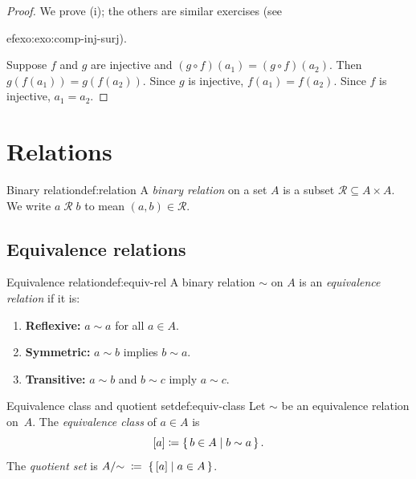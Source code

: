 \begin{proof}
We prove (i); the others are similar exercises (see

ef{exo:exo:comp-inj-surj}).

Suppose $f$ and $g$ are injective and $(g\circ f)(a_1) = (g\circ f)(a_2)$.
Then $g(f(a_1)) = g(f(a_2))$. Since $g$ is injective,
$f(a_1) = f(a_2)$. Since $f$ is injective, $a_1 = a_2$.
\end{proof}


\section{Relations}\label{sec:relations}

\begin{definition}{Binary relation}{def:relation}
A \emph{binary relation} on a set $A$ is a subset
$\mathcal{R}\subseteq A\times A$. We write $a\;\mathcal{R}\;b$ to mean
$(a,b)\in\mathcal{R}$.
\end{definition}

\subsection{Equivalence relations}\label{subsec:equiv}

\begin{definition}{Equivalence relation}{def:equiv-rel}
A binary relation $\sim$ on $A$ is an \emph{equivalence
relation} if it is:
\begin{enumerate}[label=(\roman*)]
  \item \textbf{Reflexive:} $a\sim a$ for all $a\in A$.
  \item \textbf{Symmetric:} $a\sim b$ implies $b\sim a$.
  \item \textbf{Transitive:} $a\sim b$ and $b\sim c$ imply $a\sim c$.
\end{enumerate}
\end{definition}

\begin{definition}{Equivalence class and quotient set}{def:equiv-class}
Let $\sim$ be an equivalence relation on~$A$. The \emph{equivalence
class} of $a\in A$ is
\[
  [a] \coloneqq \left\{\,b\in A\;\middle|\;b\sim a\,\right\}.
\]
The \emph{quotient set} is
$A/{\sim} \;\coloneqq\; \left\{\,[a]\;\middle|\;a\in A\,\right\}$.
\end{definition}

